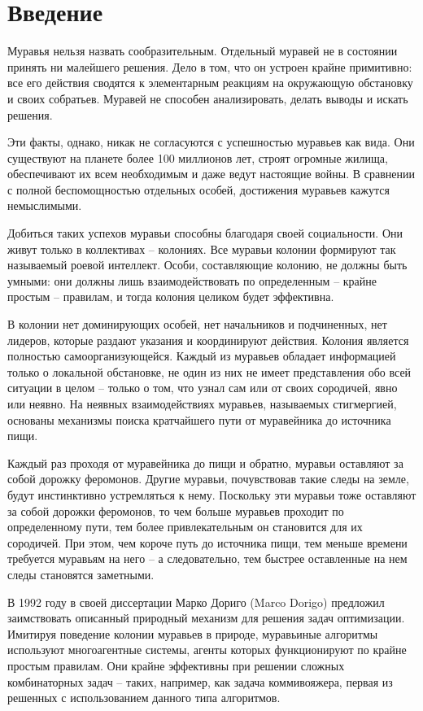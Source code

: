\newpage
\chapter*{Введение}

Муравья нельзя назвать сообразительным. Отдельный муравей не в состоянии принять ни малейшего решения. Дело в том, что он устроен крайне примитивно: все его действия сводятся к элементарным реакциям на окружающую обстановку и своих собратьев. Муравей не способен анализировать, делать выводы и искать решения.

Эти факты, однако, никак не согласуются с успешностью муравьев как вида. Они существуют на планете более 100 миллионов лет, строят огромные жилища, обеспечивают их всем необходимым и даже ведут настоящие войны. В сравнении с полной беспомощностью отдельных особей, достижения муравьев кажутся немыслимыми.

Добиться таких успехов муравьи способны благодаря своей социальности. Они живут только в коллективах – колониях. Все муравьи колонии формируют так называемый роевой интеллект. Особи, составляющие колонию, не должны быть умными: они должны лишь взаимодействовать по определенным – крайне простым – правилам, и тогда колония целиком будет эффективна.

В колонии нет доминирующих особей, нет начальников и подчиненных, нет лидеров, которые раздают указания и координируют действия. Колония является полностью самоорганизующейся. Каждый из муравьев обладает информацией только о локальной обстановке, не один из них не имеет представления обо всей ситуации в целом – только о том, что узнал сам или от своих сородичей, явно или неявно. На неявных взаимодействиях муравьев, называемых стигмергией, основаны механизмы поиска кратчайшего пути от муравейника до источника пищи.

Каждый раз проходя от муравейника до пищи и обратно, муравьи оставляют за собой дорожку феромонов. Другие муравьи, почувствовав такие следы на земле, будут инстинктивно устремляться к нему. Поскольку эти муравьи тоже оставляют за собой дорожки феромонов, то чем больше муравьев проходит по определенному пути, тем более привлекательным он становится для их сородичей. При этом, чем короче путь до источника пищи, тем меньше времени требуется муравьям на него – а следовательно, тем быстрее оставленные на нем следы становятся заметными.

В 1992 году в своей диссертации Марко Дориго (Marco Dorigo) предложил заимствовать описанный природный механизм для решения задач оптимизации. Имитируя поведение колонии муравьев в природе, муравьиные алгоритмы используют многоагентные системы, агенты которых функционируют по крайне простым правилам. Они крайне эффективны при решении сложных комбинаторных задач – таких, например, как задача коммивояжера, первая из решенных с использованием данного типа алгоритмов.


